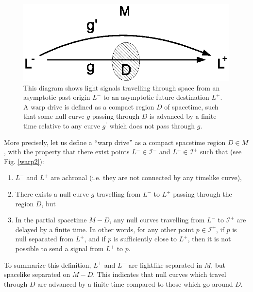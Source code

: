\documentclass{article}
\begin{document}
\begin{figure}[ht]
\centering
\includegraphics[width=.7\textwidth]{warp1.eps}
\caption{\small{
This diagram shows light signals travelling through space from an asymptotic past origin $L^-$ to an asymptotic future destination $L^+$.  A warp drive is defined as a compact region $D$ of spacetime, such that some null curve $g$ passing through $D$ is advanced by a finite time relative to any curve $g^\prime$ which does not pass through $g$.
}}\label{warp1}
\end{figure}

More precisely, let us define a ``warp drive'' as a compact spacetime region $D \in M$, with the property that there exist points $L^- \in \mathcal{I}^-$ and $L^+ \in \mathcal{I}^+$ such that (see Fig. \ref{warp2}):
\begin{enumerate}
\item $L^-$ and $L^+$ are achronal (i.e. they are not connected by any timelike curve), 
\item There exists a null curve $g$ travelling from $L^-$ to $L^+$ passing through the region $D$, but 
\item In the partial spacetime $M - D$, any null curves travelling from $L^-$ to $\mathcal{I}^+$ are delayed by a finite time.  In other words, for any other point $p \in \mathcal{I}^+$, if $p$ is null separated from $L^+$, and if $p$ is sufficiently close to $L^+$, then it is not possible to send a signal from $L^+$ to $p$. 
\end{enumerate}
To summarize this definition, $L^+$ and $L^-$ are lightlike separated in $M$, but spacelike separated on $M - D$.  This indicates that null curves which travel through $D$ are advanced by a finite time compared to those which go around $D$.
\end{document}
